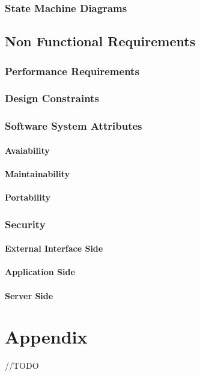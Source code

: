 \documentclass{report}
\begin{document}
		\subsection{State Machine Diagrams}

	\section{Non Functional Requirements}

		\subsection{Performance Requirements}

		\subsection{Design Constraints}

		\subsection{Software System Attributes}

			\subsubsection{Avaiability}

			\subsubsection{Maintainability}

			\subsubsection{Portability}

		\subsection{Security}

			\subsubsection{External Interface Side}

			\subsubsection{Application Side}

			\subsubsection{Server Side}


\chapter{Appendix}
//TODO
\end{document}
